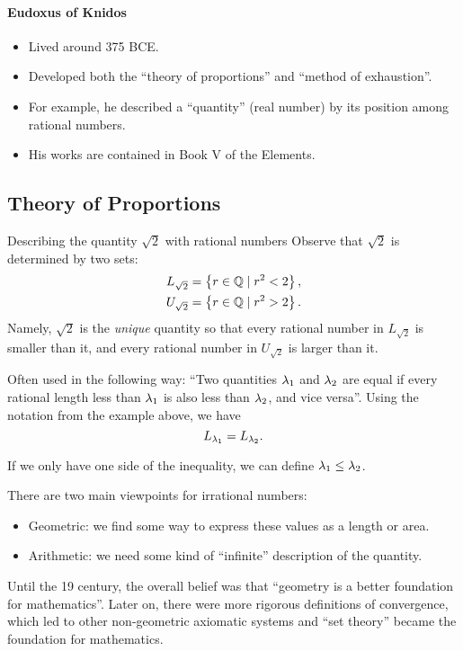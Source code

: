 \documentclass[class=article, crop=false]{standalone}
\begin{document}
  \paragraph{Eudoxus of Knidos}
  \begin{itemize}
    \item Lived around 375 BCE.
    \item Developed both the ``theory of proportions'' and ``method of exhaustion''.
    \item For example, he described a ``quantity'' (real number) by its position among rational numbers.
    \item His works are contained in Book V of the Elements.
  \end{itemize}
  \subsection{Theory of Proportions}
  \begin{example}{Describing the quantity $\sqrt{2}$ with rational numbers}
      Observe that $\sqrt{2}$ is determined by two sets:
      \begin{align*}
        L_{\sqrt{2}} &= \left\{r\in \mathbb{Q}\mid r^2 < 2\right\}, \\
        U_{\sqrt{2}} &= \left\{r\in \mathbb{Q}\mid r^2 > 2\right\}.
      \end{align*}
      Namely, $\sqrt{2}$ is the \emph{unique} quantity so that every rational number in $L_{\sqrt{2}}$ is smaller than it, and every rational number in $U_{\sqrt{2}}$ is larger than it.
  \end{example}
  Often used in the following way: ``Two quantities $\lambda_1$ and $\lambda_2$ are equal if every rational length less than $\lambda_1$ is also less than $\lambda_2$, and vice versa''. Using the notation from the example above, we have
  \[
    L_{\lambda_1} = L_{\lambda_2}.
  \]
  \begin{note}{}
    If we only have one side of the inequality, we can define $\lambda_1 \leq \lambda_2$.
  \end{note}
  There are two main viewpoints for irrational numbers:
  \begin{itemize}
    \item Geometric: we find some way to express these values as a length or area.
    \item Arithmetic: we need some kind of ``infinite'' description of the quantity.
  \end{itemize}
  Until the 19 century, the overall belief was that ``geometry is a better foundation for mathematics''. Later on, there were more rigorous definitions of convergence, which led to other non-geometric axiomatic systems and ``set theory'' became the foundation for mathematics.
\end{document}

